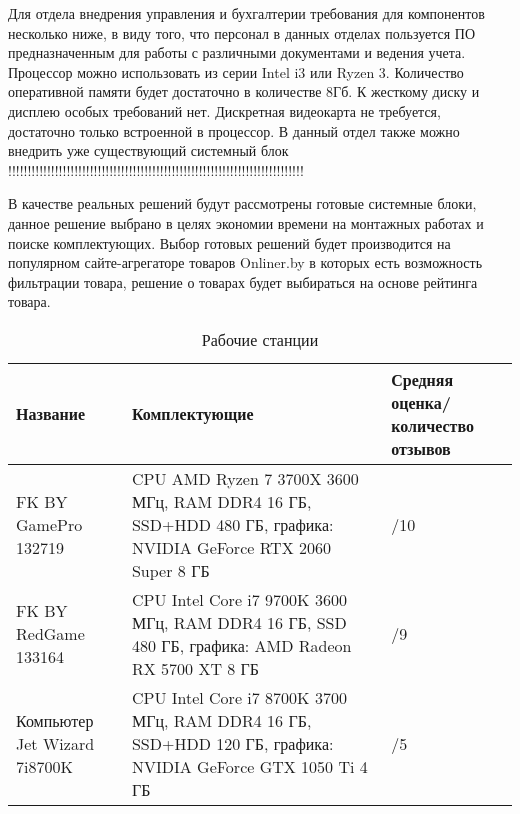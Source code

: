 Для отдела внедрения управления и бухгалтерии требования для компонентов несколько ниже, в виду того, что персонал в данных отделах пользуется ПО предназначенным для 
работы с различными документами и ведения учета. Процессор можно использовать из серии Intel i3 или Ryzen 3. Количество оперативной 
памяти будет достаточно в количестве 8Гб. К жесткому диску и дисплею особых требований нет. Дискретная видеокарта не требуется, достаточно только встроенной в процессор.
В данный отдел также можно внедрить уже существующий системный блок !!!!!!!!!!!!!!!!!!!!!!!!!!!!!!!!!!!!!!!!!!!!!!!!!!!!!!!!!!!!!!!!!!!!!!!!!!!!

В качестве реальных решений будут рассмотрены готовые системные блоки, данное решение выбрано в целях экономии времени на монтажных работах и поиске комплектующих.
Выбор готовых решений будет производится на популярном сайте-агрегаторе товаров Onliner.by в которых есть возможность фильтрации товара, решение о товарах будет выбираться на основе рейтинга товара.

\begin{table}[ht]
    \caption{Рабочие станции}
    \label{table:func:workStantionsProperty}
    \begin{tabular}{| >{\raggedright}m{}
                    | >{\raggedright\arraybackslash}m{}
                    | >{\raggedright\arraybackslash}m{}|}
        \hline
        \centering Название & \centering\arraybackslash Комплектующие & \centering\arraybackslash Средняя оценка/количество отзывов \\

        \hline
        FK BY GamePro 132719 &
        CPU AMD Ryzen 7 3700X 3600 МГц, RAM DDR4 16 ГБ, SSD+HDD 480 ГБ, графика: NVIDIA GeForce RTX 2060 Super 8 ГБ &
        4/10
        \\
        \hline
        FK BY RedGame 133164 &
        CPU Intel Core i7 9700K 3600 МГц, RAM DDR4 16 ГБ, SSD 480 ГБ, графика: AMD Radeon RX 5700 XT 8 ГБ &
        5/9
        \\
        \hline
        Компьютер Jet Wizard 7i8700K &
        CPU Intel Core i7 8700K 3700 МГц, RAM DDR4 16 ГБ, SSD+HDD 120 ГБ, графика: NVIDIA GeForce GTX 1050 Ti 4 ГБ &
        5/5
        \\
        
        \hline
    \end{tabular}
\end{table}

